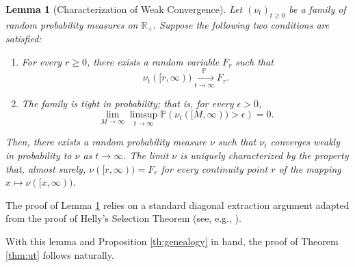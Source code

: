 \documentclass{article}
\newtheorem{lemma}[theorem]{Lemma}
\begin{document}
\begin{lemma}[Characterization of Weak Convergence]\label{lem:characterization}
    Let $(\nu_t)_{t \geq 0}$ be a family of random probability measures on $\mathbb{R}_+$. Suppose the following two conditions are satisfied:
    \begin{enumerate}
        \item[(i)] For every $r \geq 0$, there exists a random variable $F_r$ such that
        \begin{equation}
            \nu_t([r, \infty)) \xrightarrow[t \to \infty]{\mathbb{P}} F_r.
        \end{equation}
        \item[(ii)] The family is tight in probability; that is, for every $\epsilon > 0$,
        \begin{equation}
            \lim_{M \to \infty} \limsup_{t \to \infty} \mathbb{P}\left( \nu_t([M, \infty)) > \epsilon \right) = 0.
        \end{equation}
    \end{enumerate}
    Then, there exists a random probability measure $\nu$ such that $\nu_t$ converges weakly in probability to $\nu$ as $t \to \infty$. The limit $\nu$ is uniquely characterized by the property that, almost surely, $\nu([r, \infty)) = F_r$ for every continuity point $r$ of the mapping $x \mapsto \nu([x, \infty))$.
\end{lemma}

The proof of Lemma \ref{lem:characterization} relies on a standard diagonal extraction argument adapted from the proof of Helly's Selection Theorem (see, e.g., \cite[Theorem 25.9]{Billingsley}).

With this lemma and Proposition \ref{th:genealogy} in hand, the proof of Theorem \ref{thm:ut} follows naturally.
\end{document}
